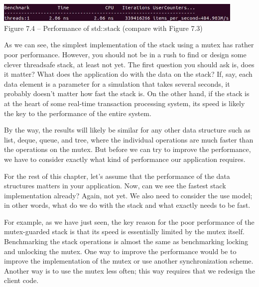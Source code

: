 \hspace*{\fill} \\ %
\begin{center}
\includegraphics[width=0.9\textwidth]{content/2/chapter7/images/4.jpg}\\
Figure 7.4 – Performance of std::stack (compare with Figure 7.3)
\end{center}

As we can see, the simplest implementation of the stack using a mutex has rather poor performance. However, you should not be in a rush to find or design some clever threadsafe stack, at least not yet. The first question you should ask is, does it matter? What does the application do with the data on the stack? If, say, each data element is a parameter for a simulation that takes several seconds, it probably doesn't matter how fast the stack is. On the other hand, if the stack is at the heart of some real-time transaction processing system, its speed is likely the key to the performance of the entire system.

By the way, the results will likely be similar for any other data structure such as list, deque, queue, and tree, where the individual operations are much faster than the operations on the mutex. But before we can try to improve the performance, we have to consider exactly what kind of performance our application requires.


For the rest of this chapter, let's assume that the performance of the data structures matters in your application. Now, can we see the fastest stack implementation already? Again, not yet. We also need to consider the use model; in other words, what do we do with the stack and what exactly needs to be fast.

For example, as we have just seen, the key reason for the poor performance of the mutex-guarded stack is that its speed is essentially limited by the mutex itself. Benchmarking the stack operations is almost the same as benchmarking locking and unlocking the mutex. One way to improve the performance would be to improve the implementation of the mutex or use another synchronization scheme. Another way is to use the mutex less often; this way requires that we redesign the client code.

